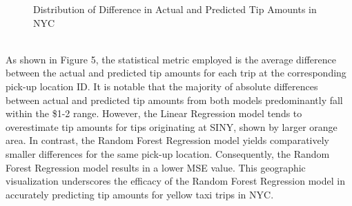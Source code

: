 \documentclass[11pt]{article}
\begin{document}
\begin{figure}[h]
    \caption{Distribution of Difference in Actual and Predicted Tip Amounts in NYC}
\end{figure}\\
As shown in Figure 5, the statistical metric employed is the average difference between the actual and predicted tip amounts for each trip at the corresponding pick-up location ID. It is notable that the majority of absolute differences between actual and predicted tip amounts from both models predominantly fall within the \$1-2 range. However, the Linear Regression model tends to overestimate tip amounts for tips originating at SINY, shown by larger orange area. In contrast, the Random Forest Regression model yields comparatively smaller differences for the same pick-up location. Consequently, the Random Forest Regression model results in a lower MSE value. This geographic visualization underscores the efficacy of the Random Forest Regression model in accurately predicting tip amounts for yellow taxi trips in NYC.
\end{document}
